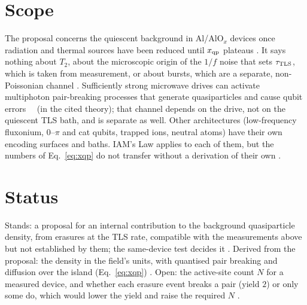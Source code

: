 \section{Scope}
The proposal concerns the quiescent background in Al/AlO$_x$ devices once radiation and thermal sources have been reduced until
$x_{\rm qp}$ plateaus \interp. It says nothing about $T_2$, about the microscopic origin of the $1/f$ noise that sets $\tau_{\rm TLS}$,
which is taken from measurement, or about bursts, which are a separate, non-Poissonian channel \interp. Sufficiently strong microwave drives can
activate multiphoton pair-breaking processes that generate quasiparticles and cause qubit errors~\cite{Chowdhury2026} \derived\ (in the cited theory); that channel
depends on the drive, not on the quiescent TLS bath, and is separate as well. Other architectures (low-frequency fluxonium, $0$--$\pi$
and cat qubits, trapped ions, neutral atoms) have their own encoding surfaces and baths. IAM's Law applies to each of them, but the
numbers of Eq.~\eqref{eq:xqp} do not transfer without a derivation of their own \interp.

\section{Status}
Stands: a proposal for an internal contribution to the background quasiparticle density, from erasures at the TLS rate, compatible with the measurements
above but not established by them; the same-device test decides it \conjecture. Derived from the proposal: the density in the field's units, with quantised pair breaking
and diffusion over the island (Eq.~\eqref{eq:xqp}) \derived. Open: the active-site count $N$ for a measured device, and whether each erasure event breaks a
pair (yield $2$) or only some do, which would lower the yield and raise the required $N$ \openprob.
